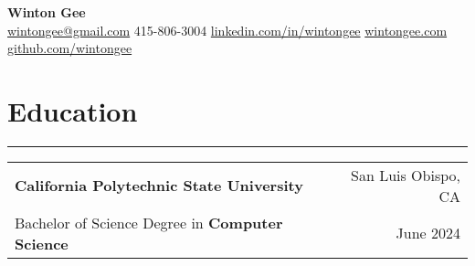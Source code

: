 \documentclass[a4paper,10pt]{article}
\begin{document}
\begin{center}
    \textbf{\Large Winton Gee} \\
    \vspace{5pt}
    \href{mailto:wintongee@gmail.com}{wintongee@gmail.com} \textbar{} 415-806-3004 \textbar{} \href{https://linkedin.com/in/wintongee}{linkedin.com/in/wintongee} \textbar{} \href{https://wintongee.com}{wintongee.com} \textbar{} \href{https://github.com/wintongee}{github.com/wintongee}
\end{center}
\section*{Education}
\vspace{-18pt}
\noindent\rule{\textwidth}{0.4pt}
\vspace{5pt}
\begin{tabularx}{\textwidth}{@{}lXr@{}}
\textbf{California Polytechnic State University} & & San Luis Obispo, CA \\
Bachelor of Science Degree in \textbf{Computer Science} & & June 2024
\end{tabularx}
\end{document}
